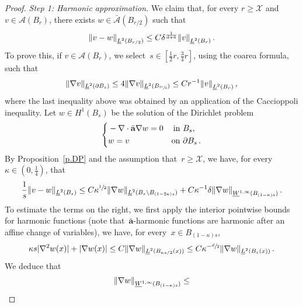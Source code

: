 \documentclass[11pt]{article} %
\numberwithin{equation}{section}
\theoremstyle{definition}
\let\originalleft\left
\let\originalright\right
\renewcommand{\left}{\mathopen{}\mathclose\bgroup\originalleft}
\renewcommand{\right}{\aftergroup\egroup\originalright}
\renewcommand{\a}{\mathbf{a}}
\newcommand{\ahom}{\bar{\a}}
\newcommand{\X}{\mathcal{X}}
\newcommand{\A}{\mathcal{A}}
\newcommand{\Ahom}{\bar{\A}}
\begin{document}
\begin{proof}
\emph{Step 1: Harmonic approximation.} 
We claim that, for every $r \geq \X$ and~$v \in \A(B_r)$, there exists $w \in \Ahom (B_{r/2})$ such that 
\begin{equation}
\label{e.delta.harmonicapprox}
\left\| v - w \right\|_{\underline{L}^2(B_{r/2})}
\leq 
C\delta^{\frac{1}{d+6}} 
\left\| v \right\|_{\underline{L}^2(B_{r})}
\,.
\end{equation}
To prove this, if $v\in \mathcal{A}(B_r)$, we select~$s\in [ \frac12 r, \frac34 r]$,  using the coarea formula, such that 
\begin{equation} \label{e.selectlayer}
\|  \nabla v \|_{\underline{L}^2(\partial B_s)}
\leq 
4 \|  \nabla v \|_{\underline{L}^2(B_{\sfrac{3r}{4}})}
\leq 
Cr^{-1}\left\| v \right\|_{\underline{L}^2(B_{r})}
 \,,
\end{equation}
where the last inequality above was obtained by an application of the Caccioppoli inequality. 
Let $w \in H^1(B_s)$ be the solution of the Dirichlet problem
\begin{equation*}
\left\{
\begin{aligned}
& -\nabla \cdot \ahom \nabla w = 0 & \mbox{in} & \ B_{s}, \\
& w = v
& \mbox{on} & \ \partial B_{s}\,. \\
\end{aligned}
\right.
\end{equation*}
By Proposition~\ref{p.DP} and the assumption that~$r \geq \X$, we have, for every $\kappa \in (0,\frac14)$,  that
\begin{equation}
\label{e.vtildekappa.to.w}
\frac1s
\| v - w \|_{\underline{L}^2(B_s)} 
\leq
C\kappa^{\sfrac12} 
\| \nabla w \|_{\underline{L}^2 (B_{s} \setminus B_{(1-2\kappa)s})}
+
C \kappa^{-1} \delta 
\left\| \nabla w \right\|_{\underline{W}^{1,\infty}(B_{(1-\kappa)s})} \,.
\end{equation}
To estimate the terms on the right, we first apply the interior pointwise bounds for harmonic functions (note that~$\ahom$-harmonic functions are harmonic after an affine change of variables), we have, for every~$x \in B_{(1-\kappa)s}$,   
\begin{equation*}  
\kappa s | \nabla^2 w(x)| + | \nabla w(x)| 
\leq 
C  \| \nabla w \|_{\underline{L}^2(B_{\kappa s/2}(x))} 
\leq 
C \kappa^{-\sfrac d2} \| \nabla w \|_{\underline{L}^2(B_s(x))}\,.
\end{equation*}
We deduce that 
\begin{equation*}
\left\| \nabla w \right\|_{\underline{W}^{1,\infty}(B_{(1-\kappa) s})}
\leq

\end{equation*}
\end{proof}
\end{document}
